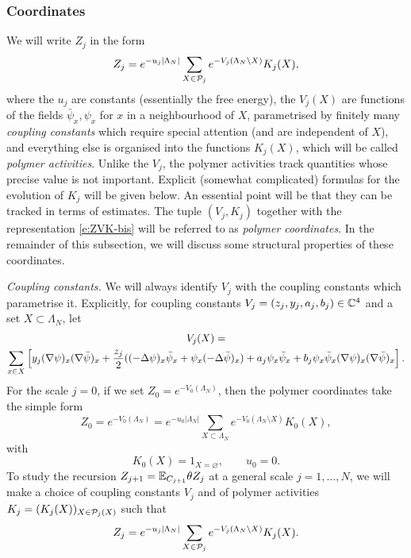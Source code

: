 \documentclass[11pt]{amsart}
\numberwithin{equation}{section}
\numberwithin{theorem}{section}
\newcommand{\1}{{\bf 1}}
\begin{document}
\subsubsection{Coordinates}

We will write $Z_j$ in the form
\begin{equation} \label{e:ZVK-bis}
  Z_{j}
  = e^{-u_{j}|\Lambda_{N}|} \sum_{X\in\mathcal P_{j}} e^{-V_{j}(\Lambda_{N}\setminus X)} K_{j}(X),
\end{equation}
where the $u_j$ are constants (essentially the free energy), the
$V_j(X)$ are functions of the fields $\bar\psi_x,\psi_x$ for $x$ in a
neighbourhood of $X$, parametrised by finitely many \emph{coupling
constants} which require special attention (and are independent of
$X$), and everything else is organised into the functions $K_j(X)$,
which will be called \emph{polymer activities}.  Unlike the $V_{j}$,
the polymer activities track quantities whose precise value is not
important.  Explicit (somewhat complicated) formulas for the evolution
of $K_{j}$ will be given below.  An essential point will be that they
can be tracked in terms of estimates.  The tuple $(V_j,K_j)$ together
with the representation \eqref{e:ZVK-bis} will be referred to as
\emph{polymer coordinates}.  In the remainder of this subsection, we
will discuss some structural properties of these coordinates.


\medskip\noindent\emph{Coupling constants.}
We will always identify $V_j$ with the coupling constants which parametrise it.
Explicitly,
for coupling constants $V_j=(z_j,y_j,a_j,b_j) \in \mathbb{C}^4$
and a set  $X \subset \Lambda_{N}$, let
\begin{multline} \label{e:VX-bis}
  V_j(X)
  =
  \\
  \sum_{x\in X} \left[{ y_j (\nabla\psi)_x (\nabla\bar\psi)_x + \frac{z_j}{2}((-\Delta\psi)_x\bar\psi_x + \psi_x(-\Delta\bar\psi)_x) + a_j \psi_x\bar\psi_x + b_j \psi_x\bar\psi_x (\nabla \psi)_x(\nabla\bar\psi)_x}\right]
  .
\end{multline}
For the scale $j=0$, if we set $ Z_0 = e^{-V_0(\Lambda_{N})}$, then the
polymer coordinates take the simple form
\begin{equation} \label{e:Z0}
  Z_0 = e^{-V_0(\Lambda_{N})}
  = e^{-u_{0}|\Lambda_{N}|}\sum_{X \subset \Lambda_{N}} e^{-V_0(\Lambda_{N} \setminus X)} K_0(X),
\end{equation}
with
\begin{equation}
  K_0(X) = 1_{X=\varnothing}, \qquad u_{0}=0.
\end{equation}
%
To study the recursion $ Z_{j+1}=\mathbb{E}_{C_{j+1}}\theta Z_{j}$ at a general scale $j=1,\dots,N$, we will make a choice of coupling constants $V_{j}$
and of polymer activities $K_j=(K_j(X))_{X\in \mathcal P_j(X)}$ such that
\begin{equation} \label{e:ZVK}
  Z_{j}
  = e^{-u_{j}|\Lambda_{N}|} \sum_{X\in\mathcal P_{j}} e^{-V_{j}(\Lambda_{N}\setminus X)} K_{j}(X).
\end{equation}
\end{document}

